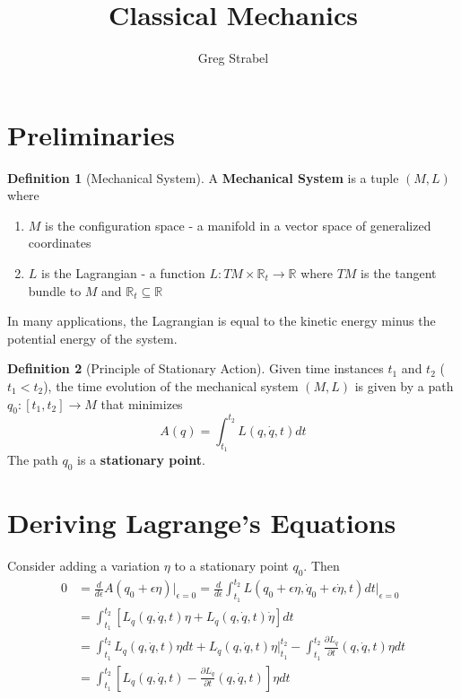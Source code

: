 \documentclass[11pt]{article}
\author{Greg Strabel}
\title{Classical Mechanics}
\theoremstyle{definition}
\newtheorem{definition}{Definition}[section]
\begin{document}
\maketitle
\section{Preliminaries}
\begin{definition}[Mechanical System]
A \textbf{Mechanical System} is a tuple $\left( M , L \right)$ where
\begin{enumerate}
\item $M$ is the configuration space - a manifold in a vector space of generalized coordinates
\item $L$ is the Lagrangian - a function $L: TM \times \mathbb{R}_t \rightarrow \mathbb{R}$ where $TM$ is the tangent bundle to $M$ and $\mathbb{R}_t \subseteq \mathbb{R}$ 
\end{enumerate}
\end{definition}

In many applications, the Lagrangian is equal to the kinetic energy minus the potential energy of the system.

\begin{definition}[Principle of Stationary Action]
Given time instances $t_1$ and $t_2$ ($t_1 < t_2$), the time evolution of the mechanical system $\left( M , L \right)$ is given by a path $q_0 : \left[ t_1, t_2 \right] \rightarrow M$ that minimizes
\begin{equation}
A \left( q \right) = \int_{t_1}^{t_2} L \left( q, \dot{q}, t \right) dt
\end{equation}
The path $q_0$ is a \textbf{stationary point}.
\end{definition}

\section{Deriving Lagrange's Equations}

Consider adding a variation $\eta$ to a stationary point $q_0$. Then
\begin{equation}
\begin{split}
0 & = \frac{d}{d \epsilon} A \left( q_0 + \epsilon \eta \right) \rvert_{\epsilon = 0}
= \frac{d}{d \epsilon} \int_{t_1}^{t_2} L \left( q_0 + \epsilon \eta, \dot{q}_0 + \epsilon \dot{\eta}, t \right) dt \rvert_{\epsilon = 0} \\
& = \int_{t_1}^{t_2} \left[ L_q \left( q, \dot{q}, t \right) \eta + L_{\dot{q}} \left( q, \dot{q}, t \right) \dot{\eta} \right] dt \\
& = \int_{t_1}^{t_2} L_q \left(q,\dot{q},t \right) \eta dt + L_{\dot{q}} \left( q, \dot{q} , t \right) \eta \rvert_{t_1}^{t_2}
 - \int_{t_1}^{t_2} \frac{\partial L_{\dot{q}}}{\partial t}  \left( q, \dot{q} , t \right) \eta dt \\
 & = \int_{t_1}^{t_2} \left[ L_q \left( q, \dot{q}, t \right) - \frac{\partial L_{\dot{q}}}{\partial t} \left( q, \dot{q}, t \right) \right] \eta dt
 \end{split}
\end{equation}
\end{document}
